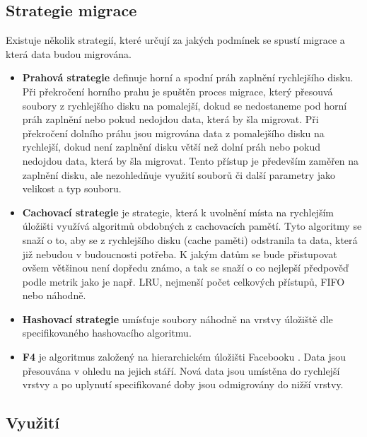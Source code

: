 \documentclass[czech,DP]{thesiskiv}
\begin{document}
\subsection{Strategie migrace} \label{strategiemigrace}

Existuje několik strategií, které určují za jakých podmínek se spustí migrace a která data budou migrována. 

\begin{itemize}

\item \textbf{Prahová strategie} \cite{HSMHighLow} definuje horní a spodní práh zaplnění rychlejšího disku. Při překročení horního prahu je spuštěn proces migrace, který přesouvá soubory z rychlejšího disku na pomalejší, dokud se nedostaneme pod horní práh zaplnění nebo pokud nedojdou data, která by šla migrovat. Při překročení dolního práhu jsou migrována data z pomalejšího disku na rychlejší, dokud není zaplnění disku větší než dolní práh nebo pokud nedojdou data, která by šla migrovat. Tento přístup je především zaměřen na zaplnění disku, ale nezohledňuje využití souborů či další parametry jako velikost a typ souboru.

\item \textbf{Cachovací strategie} je strategie, která k uvolnění místa na rychlejším úložišti využívá algoritmů obdobných z cachovacích pamětí. Tyto algoritmy se snaží o to, aby se z rychlejšího disku (cache paměti) odstranila ta data, která již nebudou v budoucnosti potřeba. K jakým datům se bude přistupovat ovšem většinou není dopředu známo, a tak se snaží o co nejlepší předpověď podle metrik jako je např. LRU, nejmenší počet celkových přístupů, FIFO nebo náhodně.

\item \textbf{Hashovací strategie} umísťuje soubory náhodně na vrstvy úložiště dle specifikovaného hashovacího algoritmu.

\item \textbf{F4} je algoritmus založený na hierarchickém úložišti Facebooku \cite{f4fbpaper}. Data jsou přesouvána v ohledu na jejich stáří. Nová data jsou umístěna do rychlejší vrstvy a po uplynutí specifikované doby jsou odmigrovány do nižší vrstvy.

\end{itemize}

\subsection{Využití}
\end{document}
